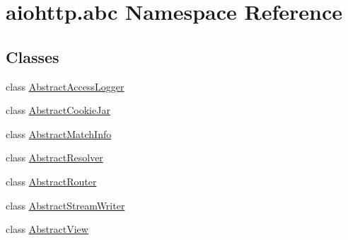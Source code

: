 \hypertarget{namespaceaiohttp_1_1abc}{}\section{aiohttp.\+abc Namespace Reference}
\label{namespaceaiohttp_1_1abc}
\subsection*{Classes}
\begin{DoxyCompactItemize}
\item 
class \hyperlink{classaiohttp_1_1abc_1_1_abstract_access_logger}{Abstract\+Access\+Logger}
\item 
class \hyperlink{classaiohttp_1_1abc_1_1_abstract_cookie_jar}{Abstract\+Cookie\+Jar}
\item 
class \hyperlink{classaiohttp_1_1abc_1_1_abstract_match_info}{Abstract\+Match\+Info}
\item 
class \hyperlink{classaiohttp_1_1abc_1_1_abstract_resolver}{Abstract\+Resolver}
\item 
class \hyperlink{classaiohttp_1_1abc_1_1_abstract_router}{Abstract\+Router}
\item 
class \hyperlink{classaiohttp_1_1abc_1_1_abstract_stream_writer}{Abstract\+Stream\+Writer}
\item 
class \hyperlink{classaiohttp_1_1abc_1_1_abstract_view}{Abstract\+View}
\end{DoxyCompactItemize}
